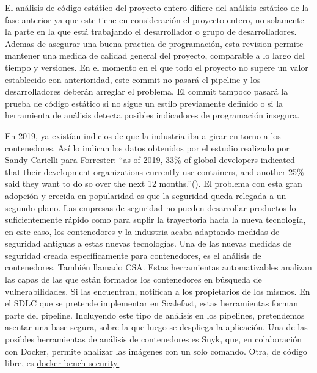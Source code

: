 \documentclass[12pt]{report} %
\begin{document}
El análisis de código estático del proyecto entero difiere del análisis estático
de la fase anterior ya que este tiene en consideración el proyecto entero, no
solamente la parte en la que está trabajando el desarrollador o grupo de
desarrolladores.  Ademas de asegurar una buena practica de programación, esta
revision permite mantener una medida de calidad general del proyecto, comparable
a lo largo del tiempo y versiones.  En el momento en el que todo el proyecto no
supere un valor establecido con anterioridad, este commit no pasará el
\gls{pipeline} y los desarrolladores deberán arreglar el problema.  El commit
tampoco pasará la prueba de código estático si no sigue un estilo previamente
definido o si la herramienta de análisis detecta posibles indicadores de
programación insegura.

En 2019, ya existían indicios de que la industria iba a girar en torno a los
contenedores.
Así lo indican los datos obtenidos por el estudio realizado por Sandy Carielli
para Forrester:
``as of 2019, 33\% of global developers indicated that their development
organizations currently use containers, and another 25\% said they want to do so
over the next 12 months.''(\cite{Carielli2020}).
El problema con esta gran adopción y crecida en popularidad es que la seguridad
queda relegada a un segundo plano.
Las empresas de seguridad no pueden desarrollar productos lo suficientemente
rápido como para suplir la trayectoria hacia la nueva tecnología, en este caso,
los contenedores y la industria acaba adaptando medidas de seguridad antiguas a
estas nuevas tecnologías.
Una de las nuevas medidas de seguridad creada específicamente para contenedores,
es el análisis de contenedores.
También llamado \gls{CSA}.
Estas herramientas automatizables analizan las capas de las que están formados los
contenedores en búsqueda de vulnerabilidades.
Si las encuentran, notifican a los propietarios de los mismos.
En el \gls{SDLC} que se pretende implementar en Scalefast, estas herramientas
forman parte del \gls{pipeline}.
Incluyendo este tipo de análisis en los \gls{pipeline}s, pretendemos asentar una
base segura, sobre la que luego se despliega la aplicación. 
Una de las posibles herramientas de análisis de contenedores es Snyk, que, en
colaboración con Docker, permite analizar las imágenes con un solo comando.
Otra, de código libre, es \href{https://github.com/docker/docker-bench-security}{docker-bench-security.}
\end{document}
